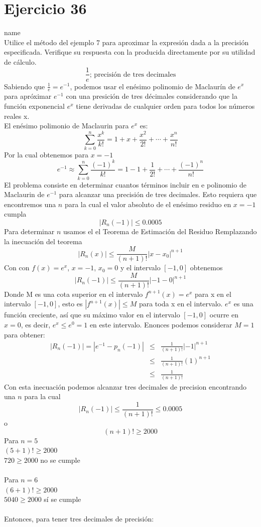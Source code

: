 \documentclass[12pt]{article}
\begin{document}
\section{Ejercicio 36} name \\

Utilice el método del ejemplo 7 para aproximar la expresión dada a la precisión especificada. Verifique su respuesta con la producida directamente por su utilidad de cálculo.
\[\frac{1}{e}\text{; precisión de tres decimales}\]
Sabiendo que $ \frac{1}{e} = e^{-1} $, podemos usar el enésimo polinomio de Maclaurín de $e^{x}$ para apróximar $e^{-1}$ con una presición de tres décimales considerando que la función exponencial $e^{x}$ tiene derivadas de cualquier orden para todos los números reales x.\\
El enésimo polimonio de Maclaurin para $e^x$ es:
\[
\sum_{k=0}^{n}\frac{x^{k}}{k!} = 1 + x + \frac{x^{2}}{2!}+ \cdots + \frac{x^{n}}{n!}
\]
Por la cual obtenemos para $x = -1$
\[
e^{-1} \approx \sum_{k=0}^{n}\frac{(-1)^{k}}{k!} = 1 - 1 + \frac{1}{2!}+ \cdots + \frac{(-1)^{n}}{n!}
\]
El problema consiste en determinar cuantos términos incluir en e polinomio de Maclaurin de $e^{-1}$ para alcanzar una precisión de tres decimales. Esto requiera que encontremos una $n$ para la cual el valor absoluto de el enésimo residuo en $x = -1$ cumpla
\[
\left| R_n (-1) \right| \leq 0.0005
\]
Para determinar $n$ usamos el el Teorema de Estimación del Residuo 
Remplazando la inecuación del teorema 
\[
\left| R_n (x)  \right|  \leq \frac{M}{(n+1)!} \left| x-x_0  \right|^{n+1}
\]
Con con $f(x) = e ^{x}$, $x = -1$, $x_0 = 0$ y el intervalo $[-1, 0]$ obtenemos
\[
\left| R_n (-1)  \right|  \leq \frac{M}{(n+1)!} \left| -1-0  \right|^{n+1}
\]
Donde M es una cota superior en el intervalo $f^{n+1}(x) = e^{x}$ para x en el intervalo $[-1, 0]$, esto es $\left|f^{n+1}(x)\right| \leq M$ para toda  x en el intervalo. $e^x$ es una función creciente, así que su máximo valor en el intervalo $[-1, 0]$ ocurre en $x=0$, es decir, $e^{x} \leq e^{0} =1$ en este intervalo. Enonces podemos considerar $M = 1$ para obtener:
\begin{eqnarray}
\left| R_n (-1)  \right| = \left| e^{-1}- p_n(-1)  \right|
&\leq & \frac{1}{(n+1)!} \left| -1\right|^{n+1} \nonumber
\\
&\leq & \frac{1}{(n+1)!} (1)^{n+1} \nonumber
\\
&\leq & \frac{1}{(n+1)!}  \nonumber
\end{eqnarray}
Con esta inecuación podemos alcanzar tres decimales de precision encontrando una $n$ para la cual
\[
\left| R_n (-1)  \right|  \leq  \frac{1}{(n+1)!} \leq 0.0005
\]
o
\[
(n+1)! \geq 2000
\]
Para $n = 5$ \\
$(5+1)! \geq 2000$ \\
$720 \geq  2000$ no se cumple \\ \\
Para $n = 6$ \\
$(6+1)! \geq 2000$ \\
$ 5040 \geq  2000$ sí se cumple \\ \\
Entonces, para tener tres decimales de precisión:
\end{document}
